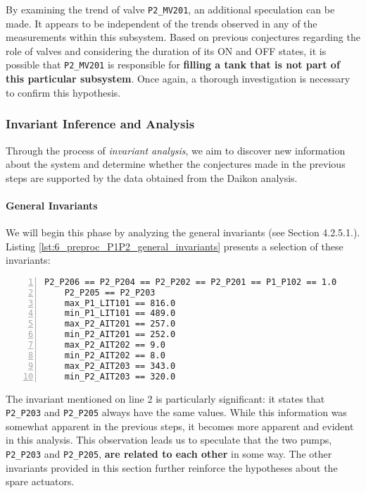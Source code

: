\bigskip
By examining the trend of valve \texttt{P2\_MV201}, an additional speculation can be made. It appears to be independent of the trends observed in any of the measurements within this subsystem. Based on previous conjectures regarding the role of valves and considering the duration of its ON and OFF states, it is possible that \texttt{P2\_MV201} is responsible for \textbf{filling a tank that is not part of this particular subsystem}. Once again, a thorough investigation is necessary to confirm this hypothesis.

		
\subsubsection{Invariant Inference and Analysis}
\label{subsubsec:6_P1P2_invariants}
Through the process of \textit{invariant analysis}, we aim to discover new information about the system and determine whether the conjectures made in the previous steps are supported by the data obtained from the Daikon analysis.

\paragraph{General Invariants}
\label{par:6_P1P2_general_invariant}
We will begin this phase by analyzing the general invariants (see Section 4.2.5.1.). Listing \ref{lst:6_preproc_P1P2_general_invariants} presents a selection of these invariants:

\begin{lstlisting}[language=bash, numbers=left, caption=General Invariants for PLC1-2, label=lst:6_preproc_P1P2_general_invariants]
	P2_P206 == P2_P204 == P2_P202 == P2_P201 == P1_P102 == 1.0
	P2_P205 == P2_P203
	max_P1_LIT101 == 816.0
	min_P1_LIT101 == 489.0
	max_P2_AIT201 == 257.0
	min_P2_AIT201 == 252.0
	max_P2_AIT202 == 9.0
	min_P2_AIT202 == 8.0
	max_P2_AIT203 == 343.0
	min_P2_AIT203 == 320.0
\end{lstlisting}

The invariant mentioned on line 2 is particularly significant: it states that \texttt{P2\_P203} and \texttt{P2\_P205} always have the same values. While this information was somewhat apparent in the previous steps, it becomes more apparent and evident in this analysis. This observation leads us to speculate that the two pumps, \texttt{P2\_P203} and \texttt{P2\_P205}, \textbf{are related to each other} in some way. The other invariants provided in this section further reinforce the hypotheses about the spare actuators.

